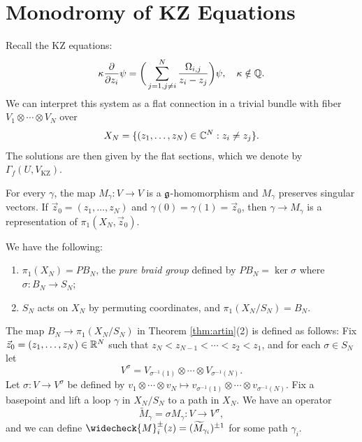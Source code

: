 \section{Monodromy of KZ Equations}

\begin{remark}
  Recall the KZ equations:
  \[
    \kappa \frac{\partial}{\partial z_i}
    \psi
    = \bigg(
      \sum_{j = 1, j \ne i}^N \frac{\Omega_{i, j}}{z_i - z_j}
    \bigg) \psi, \quad \kappa \notin \mathbb{Q}.
  \]
  We can interpret this system as a flat
  connection in a trivial bundle
  with fiber
  $V_1 \otimes \cdots \otimes V_N$ over
  \[
    X_N = \{
      (z_1, \dots, z_N) \in \mathbb{C}^N : z_i \ne z_j
    \}.
  \]
  The solutions are then given by
  the flat sections, which
  we denote by $\Gamma_f(U, V_{\mathrm{KZ}})$.
\end{remark}

\begin{prop}
  For every $\gamma$, the map
  $M_\gamma : V \to V$ is a $\mathfrak{g}$-homomorphism
  and $M_\gamma$ preserves singular
  vectors. If
  $\vec{z}_0 = (z_1, \dots, z_N)$ and
  $\gamma(0) = \gamma(1) = \vec{z}_0$, then
  $\gamma \to M_\gamma$ is a
  representation of
  $\pi_1(X_N, \vec{z}_0)$.
\end{prop}

\begin{theorem}[Artin]\label{thm:artin}
  We have the following:
  \begin{enumerate}
    \item $\pi_1(X_N) = PB_N$, the
      \emph{pure braid group}
      defined by
      $PB_N = \ker \sigma$ where
      $\sigma : B_N \to S_N$;
    \item $S_N$ acts on $X_N$ by
      permuting coordinates, and
      $\pi_1(X_N / S_N) = B_N$.
  \end{enumerate}
\end{theorem}

\begin{remark}
  The map
  $B_N \to \pi_{1}(X_N / S_N)$ in
  Theorem \ref{thm:artin}(2) is defined as
  follows: Fix
  $\vec{z}_0 = (z_1, \dots, z_N) \in \mathbb{R}^N$
  such that $z_N < z_{N - 1} < \cdots < z_2 < z_1$,
  and for each $\sigma \in S_N$ let
  \[
    V^\sigma
    = V_{\sigma^{-1}(1)} \otimes \cdots \otimes V_{\sigma^{-1}(N)}.
  \]
  \pagebreak
  Let $\sigma : V \to V^\sigma$
  be defined by
  $v_1 \otimes \cdots \otimes v_N \mapsto
  v_{\sigma^{-1}(1)} \otimes \cdots \otimes v_{\sigma^{-1}(N)}$.
  Fix a basepoint and lift a loop
  $\gamma$ in $X_N / S_N$ to a path
  in $X_N$. We have an operator
  \[
    \widetilde{M}_\gamma
    = \sigma M_\gamma
    : V \longrightarrow V^\sigma,
  \]
  and we can define
  $\widecheck{M}^{\pm}_i(z) = (\widetilde{M}_{\gamma_i})^{\pm 1}$
  for some path $\gamma_i$.
\end{remark}

